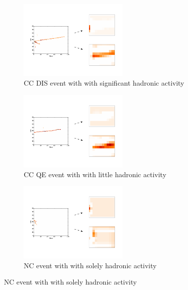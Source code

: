 \begin{figure}
  \vspace{-25pt}
  \begin{center}
  \begin{subfigure}[b]{\textwidth}
    \centering
    \includegraphics[width=0.58\textwidth,viewport=10 13 170 115, clip=true]{figures/cnn/featurePlotNuMuDIS}
    \caption*{\numu CC DIS event with with significant hadronic activity}
  \end{subfigure}%

  \begin{subfigure}[b]{\textwidth}
    \centering
    \includegraphics[width=0.58\textwidth,viewport=10 13 170 115, clip=true]{figures/cnn/featurePlotNuMuQE}
    \caption*{\numu CC QE event with with little hadronic activity}

  \end{subfigure}%

  \begin{subfigure}[b]{\textwidth}
    \centering
    \includegraphics[width=0.58\textwidth,viewport=10 13 170 115, clip=true]{figures/cnn/featurePlotNC}
    \caption*{NC event with with solely hadronic activity}


\end{subfigure}
\end{center}
\end{figure}
